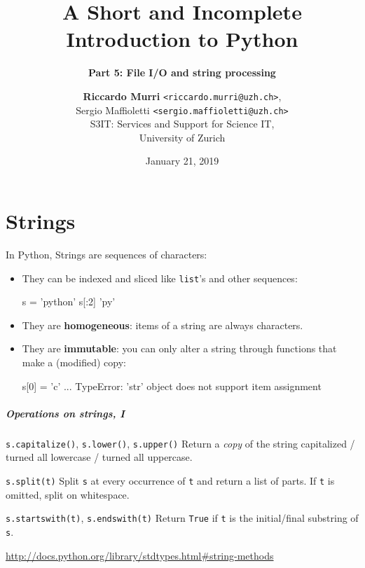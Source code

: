 \documentclass[english,serif,mathserif,xcolor=pdftex,dvipsnames,table]{beamer}
\title[4. Files and strings]{%
  A Short and Incomplete Introduction to Python
}
\subtitle{\bfseries Part 5: File I/O and string processing}
\author[R.~Murri]{%
  \textbf{Riccardo Murri} \texttt{<riccardo.murri@uzh.ch>}, \\
  Sergio Maffioletti \texttt{<sergio.maffioletti@uzh.ch>}
  \\
  S3IT: Services and Support for Science IT,
  \\
  University of Zurich
}
\date{January 21, 2019}
\begin{document}
\maketitle


\part{Strings}


\begin{frame}[fragile]
  In Python, Strings are sequences of characters:
  \begin{itemize}
  \item They can be indexed and sliced like \lstinline|list|'s and other sequences:
\begin{semiverbatim}\small
\In s = 'python'
\In s[:2]
\Out 'py'
\end{semiverbatim}
  \item They are \textbf{homogeneous}: items of a string are always characters.
  \item They are \textbf{immutable}: you can only alter a string through functions that make a (modified) copy:
\begin{semiverbatim}\small
\In s[0] = 'c'
...
TypeError: 'str' object does not support
item assignment
\end{semiverbatim}
  \end{itemize}

\end{frame}


\begin{frame}[fragile]
  \frametitle{Operations on strings, I}
  \begin{describe}{%
      \lstinline|s.capitalize()|,
      \lstinline|s.lower()|,
      \lstinline|s.upper()|}
    Return a \emph{copy} of the string capitalized / turned all lowercase /
    turned all uppercase.
  \end{describe}

  \begin{describe}{\lstinline|s.split(t)|}
    Split \texttt{s} at every occurrence of \texttt{t} and return a list
    of parts.  If \texttt{t} is omitted, split on whitespace.
  \end{describe}

  \begin{describe}{\lstinline|s.startswith(t)|,
      \lstinline|s.endswith(t)|}
    Return \texttt{True} if \texttt{t} is the initial/final substring
    of \texttt{s}.
  \end{describe}

  \begin{references}
    \url{http://docs.python.org/library/stdtypes.html#string-methods}
  \end{references}
\end{frame}
\end{document}
